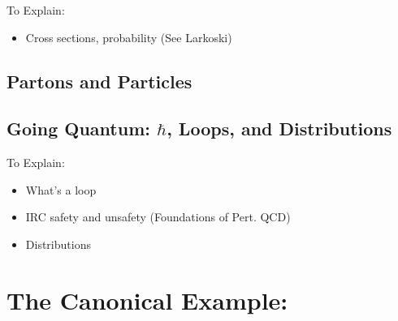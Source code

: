 \begin{sambox}{To Explain:}{}
    \begin{itemize}
        \item
            Cross sections, probability
            (See Larkoski)
    \end{itemize}
\end{sambox}


\subsection{Partons and Particles}

\subsection{Going Quantum: \texorpdfstring{\(\hbar\)}{hbar}, Loops, and Distributions}
\begin{sambox}{To Explain:}{}
    \begin{itemize}
        \item
            What's a loop

        \item
            IRC safety and unsafety (Foundations of Pert. QCD)

        \item
            Distributions
    \end{itemize}
\end{sambox}



\section{The Canonical Example: }

